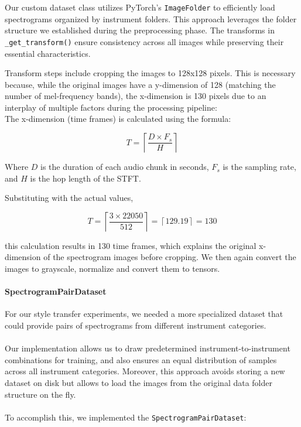 Our custom dataset class utilizes PyTorch's \texttt{ImageFolder} to efficiently load spectrograms organized by instrument folders. 
This approach leverages the folder structure we established during the preprocessing phase. 
The transforms in \texttt{\_get\_transform()} ensure consistency across all images while preserving their essential characteristics. 

Transform steps include cropping the images to 128x128 pixels. 
This is necessary because, while the original images have a y-dimension of 128 (matching the number of mel-frequency bands), 
the x-dimension is 130 pixels due to an interplay of multiple factors during the processing pipeline:
\\

The x-dimension (time frames) is calculated using the formula:

\[
T = \left\lceil \frac{D \times F_s}{H} \right\rceil
\]

Where \(D\) is the duration of each audio chunk in seconds, \(F_s\) is the sampling rate, and \(H\) is the hop length of the STFT.

Substituting with the actual values,

\[
T = \left\lceil \frac{3 \times 22050}{512} \right\rceil = \left\lceil 129.19 \right\rceil = 130
\]

this calculation results in 130 time frames, which explains the original x-dimension of the spectrogram images before cropping.
We then again convert the images to grayscale, normalize and convert them to tensors.


\paragraph{SpectrogramPairDataset}
For our style transfer experiments, we needed a more specialized dataset that could provide pairs of spectrograms from different instrument categories.
\\\\ 
Our implementation allows us to draw predetermined instrument-to-instrument combinations for training, and also ensures an equal distribution of samples across all instrument categories.
Moreover, this approach avoids storing a new dataset on disk but allows to load the images from the original data folder structure on the fly.
\\\\
To accomplish this, we implemented the \texttt{SpectrogramPairDataset}:

